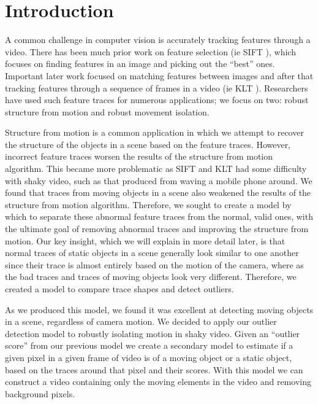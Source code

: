\section{Introduction} %
\label{sec:Introduction}

A common challenge in computer vision is accurately tracking features through a
video.
There has been much prior work on feature
selection (ie SIFT \cite{sift}), which focuses on finding features in an image
and picking out the ``best'' ones.  Important later work focused on matching
features between images and after that tracking features through a sequence of
frames in a video (ie KLT \cite{klt}).  
Researchers have used such feature traces for numerous applications; we focus
on two: robust structure from motion and robust movement isolation.    

Structure from motion is a common application in which we attempt to recover
the structure of the objects in a scene based on the feature traces.  However,
incorrect feature traces worsen the results of the structure from motion
algorithm.  This became more problematic as SIFT and KLT had some difficulty
with shaky video, such as that produced from waving a mobile phone around.
We found that traces from moving objects in a scene also weakened the
results of the structure from motion algorithm.  Therefore, we sought to create
a model by which to separate these abnormal feature traces from the normal,
valid ones, with the ultimate goal of removing abnormal traces and improving
the structure from motion.  Our key insight, which we will explain in more
detail later, is that normal traces of static objects in a scene generally look
similar to one another since their trace is almost entirely based on the motion
of the camera, where as the bad traces and traces of moving objects look very
different.  Therefore, we created a model to compare trace shapes and detect
outliers.

As we produced this model, we found it was excellent at detecting moving
objects in a scene, regardless of camera motion.  We decided to apply our
outlier detection model to robustly isolating motion in shaky video.  Given an
``outlier score'' from our previous model we create a secondary model to
estimate if a given pixel in a given frame of video is of a moving object or a
static object, based on the traces around that pixel and their scores.  With
this model we can construct a video containing only the moving elements in the
video and removing background pixels.

